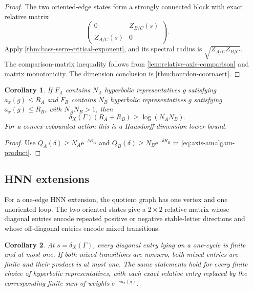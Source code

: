 \documentclass[11pt]{article}
\newtheorem{corollary}[corollary]{Corollary}
\theoremstyle{definition}
\newcommand{\e}{\mathrm e}
\begin{document}
\begin{proof}
The two oriented-edge states form a strongly connected block with exact relative matrix
\[
 \begin{pmatrix}
 0&Z_{B/C}(s)\\
 Z_{A/C}(s)&0
 \end{pmatrix}.
\]
Apply \cref{thm:bass-serre-critical-exponent}, and its spectral radius is
$\sqrt{Z_{A/C}Z_{B/C}}$.  The comparison-matrix inequality follows from
\cref{lem:relative-axis-comparison} and matrix monotonicity.  The dimension conclusion is
\cref{thm:bourdon-coornaert}.
\end{proof}

\begin{corollary}
\label{cor:bounded-axis-amalgam}
If $F_A$ contains $N_A$ hyperbolic representatives $g$ satisfying $a_x(g)\le R_A$ and $F_B$ contains
$N_B$ hyperbolic representatives $g$ satisfying $a_x(g)\le R_B$, with $N_AN_B>1$, then
\begin{equation}\label{eq:bounded-axis-amalgam}
 \delta_X(\Gamma)(R_A+R_B)\ge\log(N_AN_B).
\end{equation}
For a convex-cobounded action this is a Hausdorff-dimension lower bound.
\end{corollary}

\begin{proof}
Use $Q_A(\delta)\ge N_A\e^{-\delta R_A}$ and
$Q_B(\delta)\ge N_B\e^{-\delta R_B}$ in
\eqref{eq:axis-amalgam-product}.
\end{proof}

\subsection{HNN extensions}
For a one-edge HNN extension, the quotient graph has one vertex and one unoriented loop.  The
two oriented states give a $2\times2$ relative matrix whose diagonal entries encode repeated
positive or negative stable-letter directions and whose off-diagonal entries encode mixed
transitions.

\begin{corollary}
\label{cor:HNN}
At $s=\delta_X(\Gamma)$, every diagonal entry lying on a one-cycle is finite and at most one.
If both mixed transitions are nonzero, both mixed entries are finite and their product is at
most one.  The same statements hold for every finite choice of hyperbolic representatives, with each exact relative
entry replaced by the corresponding finite sum of weights $\e^{-s a_x(g)}$.
\end{corollary}
\end{document}
